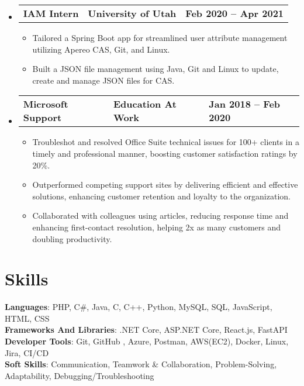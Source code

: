 \documentclass[letterpaper,11pt]{article}
\begin{document}
\begin{itemize}[leftmargin=0.05in, label={}]
	\item{
	            \begin{tabu} {X[l] X[c] X[r]}
		            \textbf{IAM Intern} & \textbf{University of Utah} & \textbf{Feb 2020 -- Apr 2021} \\
	            \end{tabu}

	            \begin{itemize}[label=$\bullet$]
		            \item{Tailored a Spring Boot app for streamlined user attribute management utilizing Apereo CAS, Git, and
					Linux.}
		            \item{Built a JSON file management using Java, Git and Linux to update, create and manage JSON
					files for CAS.}
	            \end{itemize}
	      }

	\item{
	            \begin{tabu} {X[l] X[c] X[r]}
		            \textbf{Microsoft Support} & \textbf{Education At Work} & \textbf{Jan 2018 -- Feb 2020} \\
	            \end{tabu}
	            \begin{itemize} [label=$\bullet$]
		            \item{Troubleshot and resolved Office Suite technical issues for 100+ clients in a timely and professional
					manner,
					boosting customer satisfaction ratings by 20\%.}
		            \item{Outperformed competing support sites by delivering efficient and effective solutions, enhancing
					customer retention and loyalty to the organization.}
		            \item{Collaborated with colleagues using articles, reducing response time and enhancing first-contact
					resolution, helping 2x as many customers and doubling productivity.}
	            \end{itemize}
	      }

\end{itemize}


\section{\textbf{Skills}}
\begin{itemize}[leftmargin=0.05in, label={}]
	{\item{
		            \textbf{Languages}{: PHP, C\#, Java, C, C++, Python, MySQL, SQL, JavaScript, HTML, CSS} \\
		            \textbf{Frameworks And Libraries}{: .NET Core, ASP.NET Core, React.js, FastAPI} \\
		            \textbf{Developer Tools}{: Git, GitHub , Azure, Postman, AWS(EC2), Docker, Linux, Jira, CI/CD} \\
					\textbf{Soft Skills}{: Communication, Teamwork \& Collaboration, Problem-Solving, Adaptability, Debugging/Troubleshooting} \\
		      }}
\end{itemize}
\end{document}
